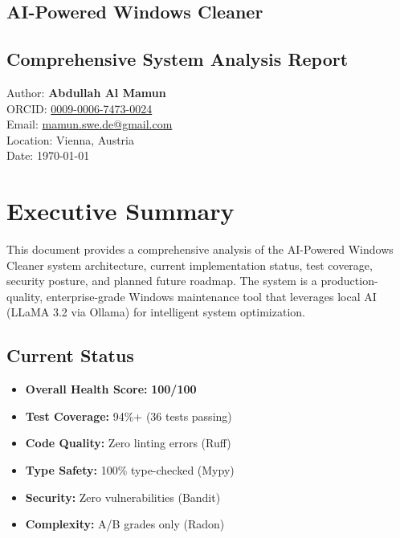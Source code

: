 \documentclass[11pt,a4paper]{article}
\begin{document}
\pagestyle{empty}

\begin{tcolorbox}[colback=codeblue!10!white,colframe=codeblue!80!black,title=System Report Header, fonttitle=\bfseries\Large]
\section*{AI-Powered Windows Cleaner}
\vspace{0.5em}
\subsection*{Comprehensive System Analysis Report}
\end{tcolorbox}

\vspace{-1em}
\begin{flushright}
\small
Author: \textbf{Abdullah Al Mamun} \\
ORCID: \href{https://orcid.org/0009-0006-7473-0024}{0009-0006-7473-0024} \\
Email: \href{mailto:mamun.swe.de@gmail.com}{mamun.swe.de@gmail.com} \\
Location: Vienna, Austria \\
Date: \today
\end{flushright}

\vspace{1em}

\section{Executive Summary}

This document provides a comprehensive analysis of the AI-Powered Windows Cleaner system architecture, current implementation status, test coverage, security posture, and planned future roadmap. The system is a production-quality, enterprise-grade Windows maintenance tool that leverages local AI (LLaMA 3.2 via Ollama) for intelligent system optimization.

\subsection{Current Status}
\begin{itemize}
    \item \textbf{Overall Health Score:} \textbf{100/100}
    \item \textbf{Test Coverage:} 94\%+ (36 tests passing)
    \item \textbf{Code Quality:} Zero linting errors (Ruff)
    \item \textbf{Type Safety:} 100\% type-checked (Mypy)
    \item \textbf{Security:} Zero vulnerabilities (Bandit)
    \item \textbf{Complexity:} A/B grades only (Radon)
\end{itemize}
\end{document}

